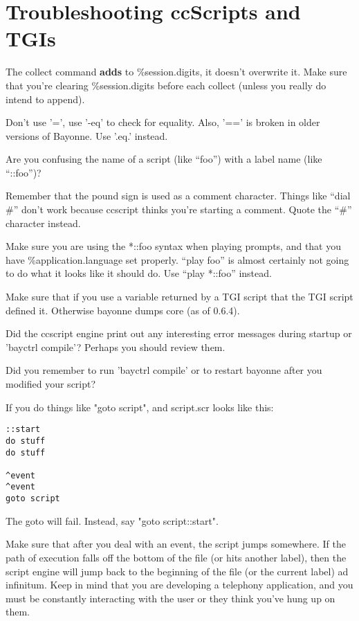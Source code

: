\documentclass[a4paper,12pt]{article}
\newcommand{\cmdn}[1]{\textbf{#1}}
\newcommand{\cmd}[1]{\cmdn{#1}\index{Command!#1}}
\begin{document}
{{{{{{{{\section{Troubleshooting ccScripts and TGIs}

The collect command \cmd{adds} to \%session.digits, it doesn't overwrite
it.  Make sure that you're clearing \%session.digits before each
collect (unless you really do intend to append).

Don't use '=', use '-eq' to check for equality.  Also, '==' is broken
in older versions of Bayonne.  Use '.eq.' instead.

Are you confusing the name of a script (like ``foo'') with a label
name (like ``::foo'')?

Remember that the pound sign is used as a comment character.  Things
like ``dial \#'' don't work because ccscript thinks you're starting a
comment.  Quote the ``\#'' character instead.

Make sure you are using the *::foo syntax when playing prompts, and
that you have \%application.language set properly.  ``play foo'' is
almost certainly not going to do what it looks like it should do.  Use
``play *::foo'' instead.

Make sure that if you use a variable returned by a TGI script that the
TGI script defined it.  Otherwise bayonne dumps core (as of 0.6.4).

Did the ccscript engine print out any interesting error messages
during startup or 'bayctrl compile'?  Perhaps you should review them.

Did you remember to run 'bayctrl compile' or to restart bayonne after
you modified your script?

If you do things like "goto script", and script.scr looks like this:

\begin{verbatim}
::start
do stuff
do stuff 

^event
^event
goto script
\end{verbatim}

The goto will fail.  Instead, say "goto script::start".

Make sure that after you deal with an event, the script jumps
somewhere.  If the path of execution falls off the bottom of the file
(or hits another label), then the script engine will jump back to the
beginning of the file (or the current label) ad infinitum.  Keep in mind
that you are developing a telephony application, and you must 
be constantly interacting with the user or they think you've hung up
on them.

}}}}}}}}
\end{document}
